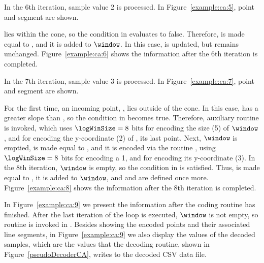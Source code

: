 \clearpage


In the 6th iteration, sample value 2 is processed. In Figure~\ref{example:ca:5}, point  and segment  are shown.




 lies within the cone, so the condition in  evaluates to false. Therefore, \snapshot is made equal to , and it is added to $\window$. In this case, \smin is updated, but \smax remains unchanged. Figure~\ref{example:ca:6} shows the information after the 6th iteration is completed.


\vspace{+5pt}


\clearpage

In the 7th iteration, sample value 3 is processed. In Figure~\ref{example:ca:7}, point  and segment  are shown.




For the first time, an incoming point, , lies outside of the cone. In this case,  has a greater slope than \smax, so the condition in  becomes true. Therefore, auxiliary routine \CAWinEnd is invoked, which uses $\logWinSize = 8$ bits for encoding the size (5) of $\window$, and \tobitexp for encoding the y-coordinate (2) of \snapshot, its last point. Next, $\window$ is emptied, \archived is made equal to , and it is encoded via the routine \CAWinStart, using $\logWinSize =8$ bits for encoding a 1, and \tobitexp for encoding its y-coordinate (3). In the 8th iteration, $\window$ is empty, so the condition in  is satisfied. Thus, \snapshot is made equal to , it is added to $\window$, and \smin and \smax are defined once more. Figure~\ref{example:ca:8} shows the information after the 8th iteration is completed.


\vspace{+5pt}


\clearpage


In Figure~\ref{example:ca:9} we present the information after the coding routine has finished. After the last iteration of the loop is executed, $\window$ is not empty, so routine \CAWinEnd is invoked in . Besides showing the encoded points and their associated line segments, in Figure~\ref{example:ca:9} we also display the values of the decoded samples, which are the values that the decoding routine, shown in Figure~\ref{pseudoDecoderCA}, writes to the decoded CSV data file. 


